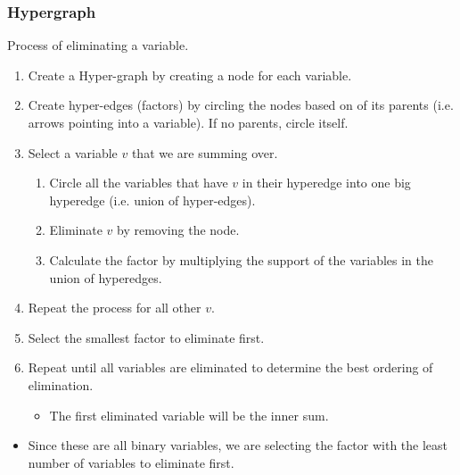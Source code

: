 \subsubsection{Hypergraph}
\begin{process} Process of eliminating a variable. 
    \begin{enumerate}
        \item Create a Hyper-graph by creating a node for each variable. 
        \item Create hyper-edges (factors) by circling the nodes based on of its parents (i.e. arrows pointing into a variable). If no parents, circle itself.
        \item Select a variable $v$ that we are summing over. 
        \begin{enumerate}
            \item Circle all the variables that have $v$ in their hyperedge into one big hyperedge (i.e. union of hyper-edges).
            \item Eliminate $v$ by removing the node. 
            \item Calculate the factor by multiplying the support of the variables in the union of hyperedges.
        \end{enumerate}
        \item Repeat the process for all other $v$. 
        \item Select the smallest factor to eliminate first.
        \item Repeat until all variables are eliminated to determine the best ordering of elimination. 
        \begin{itemize}
            \item The first eliminated variable will be the inner sum. 
        \end{itemize}
    \end{enumerate}
\end{process}
\newpage

\begin{example}
    \begin{itemize}
        \item Since these are all binary variables, we are selecting the factor with the least number of variables to eliminate first.
    \end{itemize}
\end{example}
\newpage

